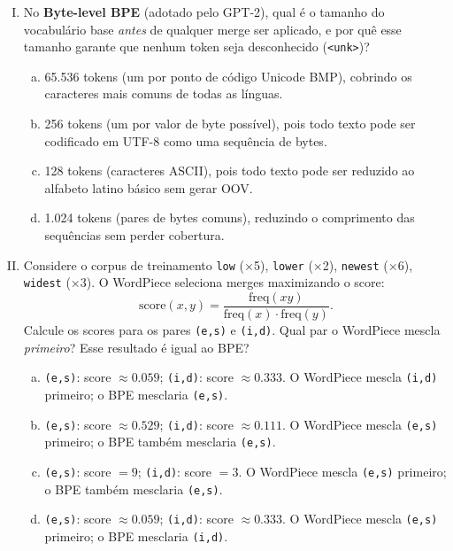 \documentclass{dlproblemset}
\begin{document}
\begin{enumerate}[I)]
\item No \textbf{Byte-level BPE} (adotado pelo GPT-2), qual é o tamanho do vocabulário
      base \emph{antes} de qualquer merge ser aplicado, e por quê esse tamanho garante
      que nenhum token seja desconhecido (\texttt{<unk>})?

\begin{enumerate}[a)]
    \item 65.536 tokens (um por ponto de código Unicode BMP), cobrindo os caracteres
          mais comuns de todas as línguas.
    \item 256 tokens (um por valor de byte possível), pois todo texto pode ser
          codificado em UTF-8 como uma sequência de bytes.
    \item 128 tokens (caracteres ASCII), pois todo texto pode ser reduzido ao
          alfabeto latino básico sem gerar OOV.
    \item 1.024 tokens (pares de bytes comuns), reduzindo o comprimento das sequências
          sem perder cobertura.
\end{enumerate}

\item Considere o corpus de treinamento \texttt{low} (×5), \texttt{lower} (×2),
      \texttt{newest} (×6), \texttt{widest} (×3). O WordPiece seleciona merges
      maximizando o score:
      \[
        \mathrm{score}(x, y) = \frac{\mathrm{freq}(xy)}{\mathrm{freq}(x) \cdot \mathrm{freq}(y)}.
      \]
      Calcule os scores para os pares \texttt{(e,s)} e \texttt{(i,d)}.
      Qual par o WordPiece mescla \emph{primeiro}? Esse resultado é igual ao BPE?

\begin{enumerate}[a)]
    \item \texttt{(e,s)}: score $\approx 0.059$; \texttt{(i,d)}: score $\approx 0.333$.
          O WordPiece mescla \texttt{(i,d)} primeiro; o BPE mesclaria \texttt{(e,s)}.
    \item \texttt{(e,s)}: score $\approx 0.529$; \texttt{(i,d)}: score $\approx 0.111$.
          O WordPiece mescla \texttt{(e,s)} primeiro; o BPE também mesclaria \texttt{(e,s)}.
    \item \texttt{(e,s)}: score $= 9$; \texttt{(i,d)}: score $= 3$.
          O WordPiece mescla \texttt{(e,s)} primeiro; o BPE também mesclaria \texttt{(e,s)}.
    \item \texttt{(e,s)}: score $\approx 0.059$; \texttt{(i,d)}: score $\approx 0.333$.
          O WordPiece mescla \texttt{(e,s)} primeiro; o BPE mesclaria \texttt{(i,d)}.
\end{enumerate}


\end{enumerate}
\end{document}
